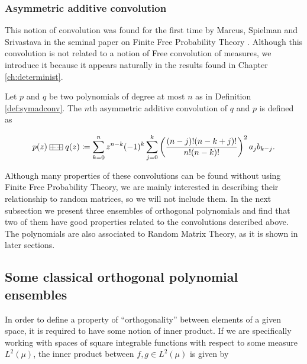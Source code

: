 \subsubsection{Asymmetric additive convolution}

This notion of convolution was found for the first time by Marcus, Spielman and Srivastava in the seminal paper on Finite Free Probability Theory \cite{article:finitefree}. Although this convolution is not related to a notion of Free convolution of measures, we introduce it because it appears naturally in the results found in Chapter \ref{ch:determinist}.


\begin{definition}
    Let $p$ and $q$ be two polynomials of degree at most $n$ as in Definition \ref{def:symadconv}. The $n$th asymmetric additive convolution of $q$ and $p$ is defined as

    \begin{align*}
        p(z) \aac q(z) \coloneqq \sum_{k=0}^n z^{n-k}(-1)^{k} \sum_{j=0}^k \left(\frac{(n-j)!(n-k+j)!}{n!(n-k)!}\right)^2 a_jb_{k-j}.
    \end{align*}
\end{definition}


Although many properties of these convolutions can be found without using Finite Free Probability Theory, we are mainly interested in describing their relationship to random matrices, so we will not include them. In the next subsection we present three ensembles of orthogonal polynomials and find that two of them have good properties related to the convolutions described above. The polynomials are also associated to Random Matrix Theory, as it is shown in later sections.

\subsection{Some classical orthogonal polynomial ensembles}

In order to define a property of ``orthogonality''  between elements of a given space, it is required to have some notion of inner product. If we are specifically working with spaces of square integrable functions with respect to some measure $L^2(\mu)$, the inner product between $f,g \in L^2(\mu)$ is given by


